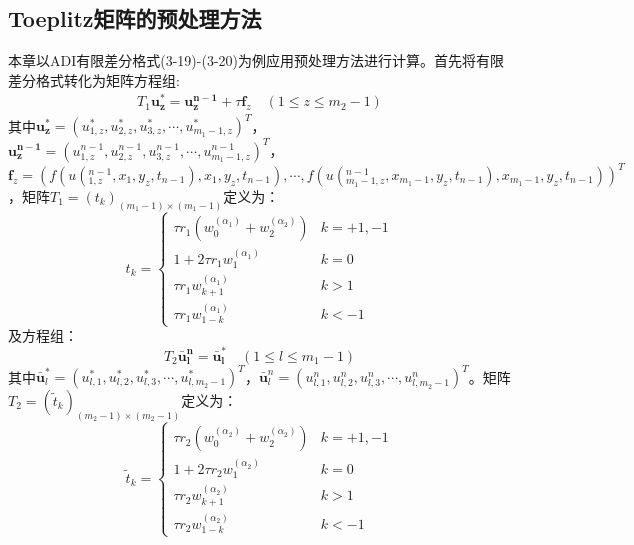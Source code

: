 \documentclass[twoside,UTF8]{nputhesis}
\begin{document}
\subsection{Toeplitz矩阵的预处理方法}

本章以ADI有限差分格式(3-19)-(3-20)为例应用预处理方法进行计算。首先将有限差分格式转化为矩阵方程组:
\begin{equation}
\begin{split}
{{T}_{1}}\bm{u_{z}^{*}}=\bm{u_{z}^{n-1}}+\tau{\bm{f}_{z}}  \quad    (1\le z\le {{m}_{2}}-1)
\end{split}
\end{equation}
其中$\bm{u_{z}^{*}}={{(u_{1,z}^{*},u_{2,z}^{*},u_{3,z}^{*},\cdots,u_{{{m}_{1}}-1,z}^{*})}^{T}}$，$\bm{u_{z}^{n-1}}={{(u_{1,z}^{n-1},u_{2,z}^{n-1},u_{3,z}^{n-1},\cdots,u_{{{m}_{1}}-1,z}^{n-1})}^{T}}$，\\${{\bm{f}_{z}}}={{(f(u(_{1,z}^{n-1},{{x}_{1}},{{y}_{z}},{{t}_{n-1}}),{{x}_{1}},{{y}_{z}},{{t}_{n-1}}),\cdots,f(u(_{{{m}_{1}}-1,z}^{n-1},{{x}_{{{m}_{1}}-1}},{{y}_{z}},{{t}_{n-1}}),{{x}_{{{m}_{1}}-1}},{{y}_{z}},{{t}_{n-1}}))}^{T}}$，矩阵${{T}_{1}}={{({{t}_{k}})}_{({{m}_{1}}-1)\times ({{m}_{1}}-1)}}$定义为：
\begin{equation}
t_{k}=\left\{\begin{array}{ll}{\tau r_{1}\left(w_{0}^{\left(\alpha_{1}\right)}+w_{2}^{\left(\alpha_{2}\right)}\right)} & {k=+1,-1} \\ {1+2 \tau r_{1} w_{1}^{\left(\alpha_{1}\right)}} & {k=0} \\ {\tau r_{1} w_{k+1}^{\left(\alpha_{1}\right)}} & {k>1} \\ {\tau r_{1} w_{1-k}^{\left(\alpha_{1}\right)}} & {k<-1}\end{array}\right.
\end{equation}
及方程组：
\begin{equation}
{{T}_{2}}\bm{\bar{u}_{l}^{n}}=\bm{\bar{u}_{l}^{*}} \quad  (1\le l\le {{m}_{1}}-1)
\end{equation}
其中$\bar{\bm{u}}_{l}^{*}={{(u_{l,1}^{*},u_{l,2}^{*},u_{l,3}^{*},\cdots ,u_{l,{{m}_{2}}-1}^{*})}^{T}}$，$\bar{\bm{u}}_{l}^{n}={{(u_{l,1}^{n},u_{l,2}^{n},u_{l,3}^{n},\cdots ,u_{l,{{m}_{2}}-1}^{n})}^{T}}$。矩阵${{T}_{2}}={{({{\tilde{t}}_{k}})}_{({{m}_{2}}-1)\times ({{m}_{2}}-1)}}$定义为：
\begin{equation}
\tilde{t}_{k}=\left\{\begin{array}{ll}{\tau r_{2}\left(w_{0}^{\left(\alpha_{2}\right)}+w_{2}^{\left(\alpha_{2}\right)}\right)} & {k=+1,-1} \\ {1+2 \tau r_{2} w_{1}^{\left(\alpha_{2}\right)}} & {k=0} \\ {\tau r_{2} w_{k+1}^{\left(\alpha_{2}\right)}} & {k>1} \\ {\tau r_{2} w_{1-k}^{\left(\alpha_{2}\right)}} & {k<-1}\end{array}\right.
\end{equation}
\end{document}
